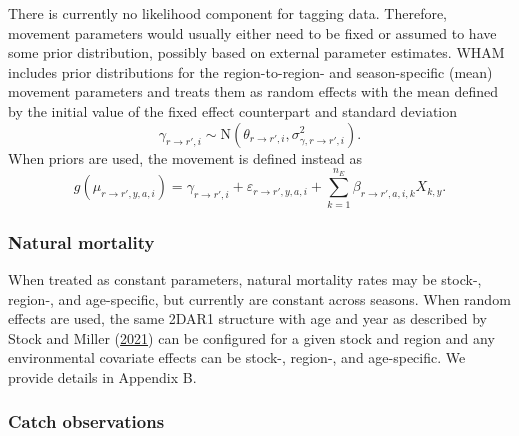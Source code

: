 \documentclass[
]{article}
\begin{document}
There is currently no likelihood component for tagging data. Therefore, movement parameters would usually either need to be fixed or assumed to have some prior distribution, possibly based on external parameter estimates. WHAM includes prior distributions for the region-to-region- and season-specific (mean) movement parameters and treats them as random effects with the mean defined by the initial value of the fixed effect counterpart and standard deviation
\begin{equation*}
  \gamma_{r\rightarrow r',i} \sim \text{N}\left(\theta_{r\rightarrow r',i}, \sigma^2_{\gamma,r\rightarrow r',i}\right).
  \end{equation*}
When priors are used, the movement is defined instead as
\begin{equation*}
  g(\mu_{r\rightarrow r',y,a,i}) = \gamma_{r\rightarrow r',i} + \varepsilon_{r\rightarrow r',y,a,i} + \sum^{n_E}_{k=1} \beta_{r\rightarrow r',a,i,k} X_{k,y}.
  \end{equation*}

\hypertarget{natural-mortality}{%
\subsubsection*{Natural mortality}\label{natural-mortality}}

When treated as constant parameters, natural mortality rates may be stock-, region-, and age-specific, but currently are constant across seasons. When random effects are used, the same 2DAR1 structure with age and year as described by Stock and Miller (\protect\hyperlink{ref-stockmiller21}{2021}) can be configured for a given stock and region and any environmental covariate effects can be stock-, region-, and age-specific. We provide details in Appendix B.

\hypertarget{catch-observations}{%
\subsubsection*{Catch observations}\label{catch-observations}}
\end{document}
